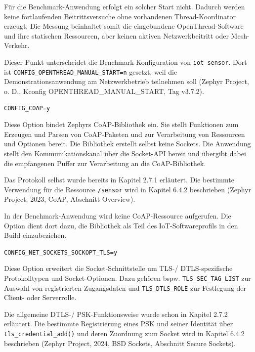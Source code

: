 F{\"u}r die Benchmark-Anwendung erfolgt ein solcher Start nicht. Dadurch werden keine fortlaufenden Beitrittsversuche ohne vorhandenen Thread-Koordinator erzeugt. Die Messung beinhaltet somit die eingebundene OpenThread-Software und ihre statischen Ressourcen, aber keinen aktiven Netzwerkbeitritt oder Mesh-Verkehr.

Dieser Punkt unterscheidet die Benchmark-Konfiguration von \lstinline[style=fileinline]|iot_sensor|. Dort ist \lstinline[style=fileinline]|CONFIG_OPENTHREAD_MANUAL_START=n| gesetzt, weil die Demonstrationsanwendung am Netzwerkbetrieb teilnehmen soll (Zephyr Project, o. D., Kconfig OPENTHREAD\_MANUAL\_START, Tag v3.7.2).

\lstinline[style=fileinline]|CONFIG_COAP=y|

Diese Option bindet Zephyrs CoAP-Bibliothek ein. Sie stellt Funktionen zum Erzeugen und Parsen von CoAP-Paketen und zur Verarbeitung von Ressourcen und Optionen bereit. Die Bibliothek erstellt selbst keine Sockets. Die Anwendung stellt den Kommunikationskanal {\"u}ber die Socket-API bereit und {\"u}bergibt dabei die empfangenen Puffer zur Verarbeitung an die CoAP-Bibliothek.

Das Protokoll selbst wurde bereits in Kapitel 2.7.1 erl{\"a}utert. Die bestimmte Verwendung f{\"u}r die Ressource \lstinline[style=fileinline]|/sensor| wird in Kapitel 6.4.2 beschrieben (Zephyr Project, 2023, \glqq{}CoAP\grqq{}, Abschnitt \glqq{}Overview\grqq{}).

In der Benchmark-Anwendung wird keine CoAP-Ressource aufgerufen. Die Option dient dort dazu, die Bibliothek als Teil des IoT-Softwareprofils in den Build einzubeziehen.

\lstinline[style=fileinline]|CONFIG_NET_SOCKETS_SOCKOPT_TLS=y|

Diese Option erweitert die Socket-Schnittstelle um TLS-/ DTLS-spezifische Protokolltypen und Socket-Optionen. Dazu geh{\"o}ren bspw. \lstinline[style=fileinline]|TLS_SEC_TAG_LIST| zur Auswahl von registrierten Zugangsdaten und \lstinline[style=fileinline]|TLS_DTLS_ROLE| zur Festlegung der Client- oder Serverrolle.

Die allgemeine DTLS-/ PSK-Funktionsweise wurde schon in Kapitel 2.7.2 erl{\"a}utert. Die bestimmte Registrierung eines PSK und seiner Identit{\"a}t {\"u}ber \lstinline[style=fileinline]|tls_credential_add()| und deren Zuordnung zum Socket wird in Kapitel 6.4.2 beschrieben (Zephyr Project, 2024, \glqq{}BSD Sockets\grqq{}, Abschnitt \glqq{}Secure Sockets\grqq{}).

